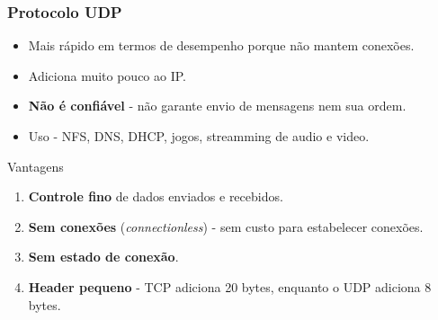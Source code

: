 \documentclass[xcolor=dvipsnames,10pt,compress,aspectratio=169]{beamer}
\begin{document}
\begin{frame}
  \frametitle{Protocolo UDP}
  \begin{itemize}
  \item Mais rápido em termos de desempenho porque não mantem conexões.
  \item Adiciona muito pouco ao IP.
  \item {\bf Não é confiável} - não garante envio de mensagens nem sua ordem.
  \item Uso - NFS, DNS, DHCP, jogos, streamming de audio e video.
  \end{itemize}
  \begin{exampleblock}{Vantagens}
    \begin{enumerate}
    \item {\bf Controle fino} de dados enviados e recebidos.
    \item {\bf Sem conexões} (\textit{connectionless}) - sem custo para estabelecer conexões.
    \item {\bf Sem estado de conexão}.
    \item {\bf Header pequeno} - TCP adiciona 20 bytes, enquanto o UDP adiciona 8 bytes.
    \end{enumerate}
  \end{exampleblock}
\end{frame}
\end{document}
